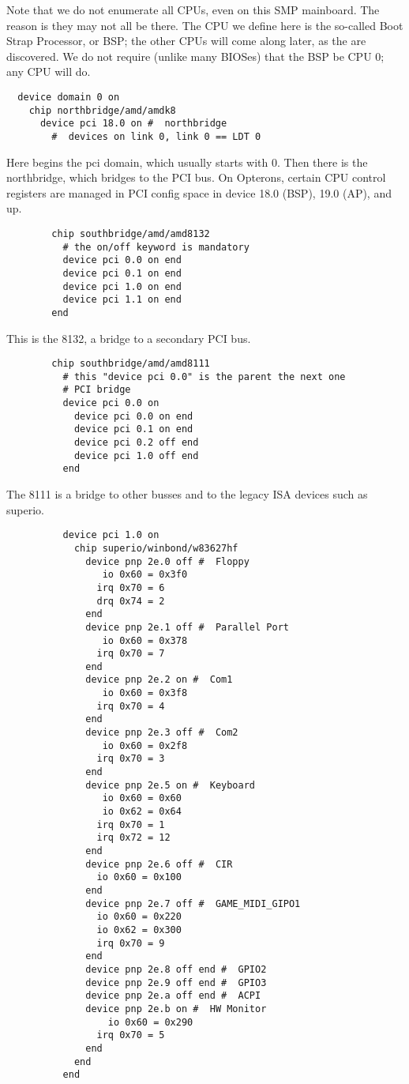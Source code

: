 \documentclass[10pt,letterpaper]{article}
\begin{document}
Note that we do not enumerate all CPUs, even on this SMP mainboard. The reason is they may not all be there. The CPU we define here
is the so-called Boot Strap Processor, or BSP; the other CPUs will come along later, as the are discovered. We do not require (unlike many
BIOSes) that the BSP be CPU 0; any CPU will do.
\begin{verbatim}
  device domain 0 on
    chip northbridge/amd/amdk8
      device pci 18.0 on #  northbridge
        #  devices on link 0, link 0 == LDT 0
\end{verbatim}
Here begins the pci domain, which usually starts with 0. Then there is the northbridge, which bridges to the PCI bus. On
Opterons, certain CPU control registers are managed in PCI config space in device 18.0 (BSP), 19.0 (AP), and up.
\begin{verbatim}
        chip southbridge/amd/amd8132
          # the on/off keyword is mandatory
          device pci 0.0 on end
          device pci 0.1 on end
          device pci 1.0 on end
          device pci 1.1 on end
        end
\end{verbatim}
This is the 8132, a bridge to a secondary PCI bus.
\begin{verbatim}
        chip southbridge/amd/amd8111
          # this "device pci 0.0" is the parent the next one
          # PCI bridge
          device pci 0.0 on
            device pci 0.0 on end
            device pci 0.1 on end
            device pci 0.2 off end
            device pci 1.0 off end
          end
\end{verbatim}
The 8111 is a bridge to other busses and to the legacy ISA devices such as superio.
\begin{verbatim}
          device pci 1.0 on
            chip superio/winbond/w83627hf
              device pnp 2e.0 off #  Floppy
                 io 0x60 = 0x3f0
                irq 0x70 = 6
                drq 0x74 = 2
              end
              device pnp 2e.1 off #  Parallel Port
                 io 0x60 = 0x378
                irq 0x70 = 7
              end
              device pnp 2e.2 on #  Com1
                 io 0x60 = 0x3f8
                irq 0x70 = 4
              end
              device pnp 2e.3 off #  Com2
                 io 0x60 = 0x2f8
                irq 0x70 = 3
              end
              device pnp 2e.5 on #  Keyboard
                 io 0x60 = 0x60
                 io 0x62 = 0x64
                irq 0x70 = 1
                irq 0x72 = 12
              end
              device pnp 2e.6 off #  CIR
                io 0x60 = 0x100
              end
              device pnp 2e.7 off #  GAME_MIDI_GIPO1
                io 0x60 = 0x220
                io 0x62 = 0x300
                irq 0x70 = 9
              end
              device pnp 2e.8 off end #  GPIO2
              device pnp 2e.9 off end #  GPIO3
              device pnp 2e.a off end #  ACPI
              device pnp 2e.b on #  HW Monitor
                  io 0x60 = 0x290
                irq 0x70 = 5
              end
            end
          end
\end{verbatim}
\end{document}
